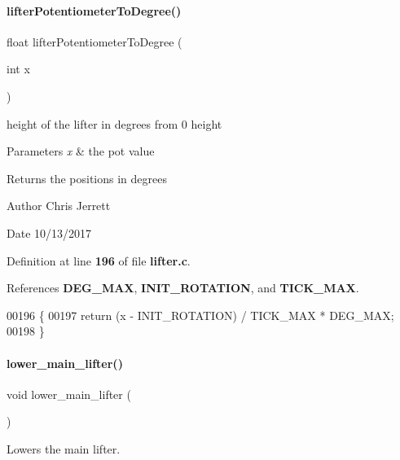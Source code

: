 \paragraph{lifter\+Potentiometer\+To\+Degree()}
{\footnotesize\ttfamily float lifter\+Potentiometer\+To\+Degree (\begin{DoxyParamCaption}\item[{int}]{x }\end{DoxyParamCaption})}



height of the lifter in degrees from 0 height 


\begin{DoxyParams}{Parameters}
{\em x} & the pot value \\
\hline
\end{DoxyParams}
\begin{DoxyReturn}{Returns}
the positions in degrees 
\end{DoxyReturn}
\begin{DoxyAuthor}{Author}
Chris Jerrett 
\end{DoxyAuthor}
\begin{DoxyDate}{Date}
10/13/2017 
\end{DoxyDate}


Definition at line \textbf{ 196} of file \textbf{ lifter.\+c}.



References \textbf{ D\+E\+G\+\_\+\+M\+AX}, \textbf{ I\+N\+I\+T\+\_\+\+R\+O\+T\+A\+T\+I\+ON}, and \textbf{ T\+I\+C\+K\+\_\+\+M\+AX}.


\begin{DoxyCode}
00196                                          \{
00197   \textcolor{keywordflow}{return} (x - INIT_ROTATION) / TICK_MAX * DEG_MAX;
00198 \}
\end{DoxyCode}
\mbox{\label{a00107_ad36c37086a91046af4e6f619618b7719}} 
\paragraph{lower\+\_\+main\+\_\+lifter()}
{\footnotesize\ttfamily void lower\+\_\+main\+\_\+lifter (\begin{DoxyParamCaption}{ }\end{DoxyParamCaption})}



Lowers the main lifter. 

